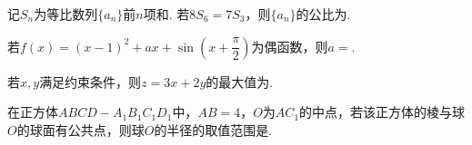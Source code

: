 \documentclass[a4paper,11pt]{report}
\begin{document}
\begin{examquestions}[start=13]
\item 记$S_n$为等比数列$\{a_n\}$前$n$项和. 若$8S_6=7S_3$，则$\{a_n\}$的公比为\blank. 
\item 若$f(x)=(x-1)^2+ax+\sin\left(x+\dfrac\pi2\right)$为偶函数，则$a=$\blank. 
\item 若$x,y$满足约束条件，则$z=3x+2y$的最大值为\blank. 
\item 在正方体$ABCD-A_1B_1C_1D_1$中，$AB=4$，$O$为$AC_1$的中点，若该正方体的棱与球$O$的球面有公共点，则球$O$的半径的取值范围是\blank. 
\end{examquestions}
\end{document}
